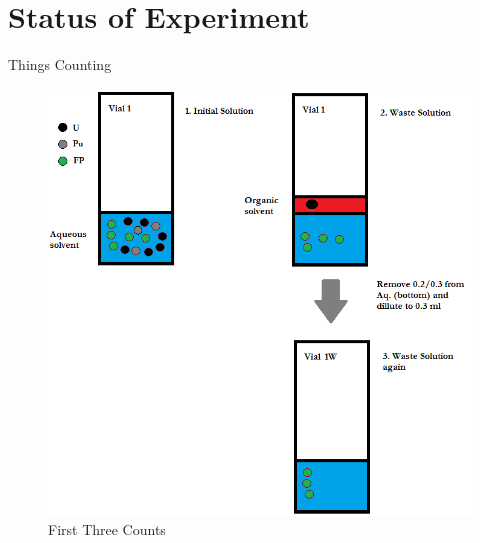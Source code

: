 \documentclass{beamer}
\begin{document}





\section{Status of Experiment}
\begin{frame}{Things Counting}
  \begin{figure}[H] %
    \begin{center}
      \includegraphics[width=0.6\linewidth]
                      {Extraction_Cycle_1_First_3_Counts}
    \end{center}
    \caption{First Three Counts}
  \end{figure}  
\end{frame}
\end{document}
